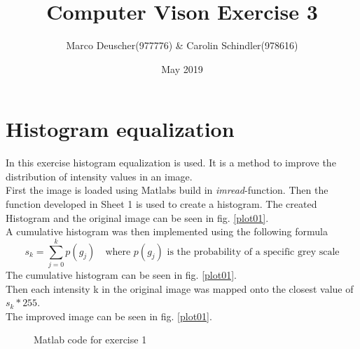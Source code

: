 \documentclass[a4paper]{article}
\title{Computer Vison Exercise 3}
\author{Marco Deuscher(977776) & Carolin Schindler(978616)}
\date{May 2019}
\begin{document}
\maketitle
\section{Histogram equalization}
In this exercise histogram equalization is used. It is a method to improve the distribution of intensity values in an image.\\
First the image is loaded using Matlabs build in \textit{imread}-function. Then the function developed in Sheet 1 is used to create a histogram. The created Histogram and the original image can be seen in fig. \ref{plot01}.\\
A cumulative histogram was then implemented using the following formula
\begin{equation*}
    s_k = \sum_{j=0}^kp(g_j)\quad \text{where $p(g_j)$ is the probability of a specific grey scale}
\end{equation*}
The cumulative histogram can be seen in fig. \ref{plot01}.\\
Then each intensity k in the original image was mapped onto the closest value of $s_k * 255$.\\
The improved image can be seen in fig. \ref{plot01}.

\begin{figure}[htp]
    \centering
    
    \caption{Matlab code for exercise 1}
    \label{ex01}
\end{figure}
\end{document}
